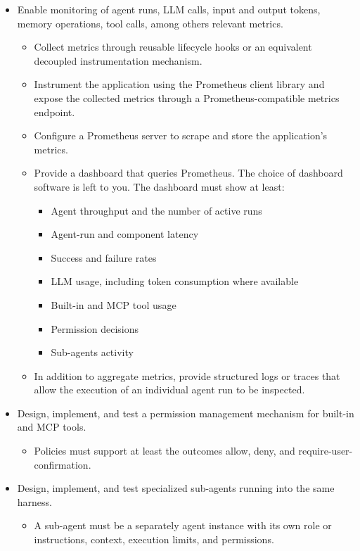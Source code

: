 \documentclass{article}
\begin{document}
\begin{itemize}
    \item Enable monitoring of agent runs, LLM calls, input and output tokens, memory operations, tool calls, among others relevant metrics.
    \begin{itemize}
        \item Collect metrics through reusable lifecycle hooks or an equivalent decoupled instrumentation mechanism.
        \item Instrument the application using the Prometheus client library and expose the collected metrics through a Prometheus-compatible metrics endpoint.
        \item Configure a Prometheus server to scrape and store the application's metrics.
        \item Provide a dashboard that queries Prometheus. The choice of dashboard software is left to you. The dashboard must show at least:
        \begin{itemize}
            \item Agent throughput and the number of active runs
            \item Agent-run and component latency
            \item Success and failure rates
            \item LLM usage, including token consumption where available
            \item Built-in and MCP tool usage
            \item Permission decisions
            \item Sub-agents activity
        \end{itemize}
        \item In addition to aggregate metrics, provide structured logs or traces that allow the execution of an individual agent run to be inspected.
    \end{itemize}
    \item Design, implement, and test a permission management mechanism for built-in and MCP tools.
    \begin{itemize}
        \item Policies must support at least the outcomes allow, deny, and require-user-confirmation.
    \end{itemize}
    \item Design, implement, and test specialized sub-agents running into the same harness.
    \begin{itemize}
        \item A sub-agent must be a separately agent instance with its own role or instructions, context, execution limits, and permissions.

\end{itemize}
\end{itemize}
\end{document}
